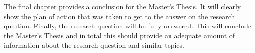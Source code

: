 \begin{slshape}
\npar

The final chapter provides a conclusion for the Master's Thesis. It will clearly show the plan of action that was taken to get to the answer on the research question. Finally, the research question will be fully answered. This will conclude the Master's Thesis and in total this should provide an adequate amount of information about the research question and similar topics. 


\end{slshape}

